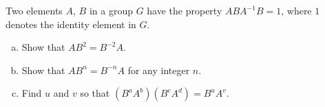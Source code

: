 Two elements $A$, $B$ in a group $G$ have the property $ABA^{-1}B = 1$, where
$1$ denotes the identity element in $G$.

\begin{enumerate}[(a)]

\item Show that $A B^2 = B^{-2} A$.
\item Show that $A B^n = B^{-n} A$ for any integer $n$.
\item Find $u$ and $v$ so that $(B^a A^b)(B^c A^d) = B^u A^v$.

\end{enumerate}
